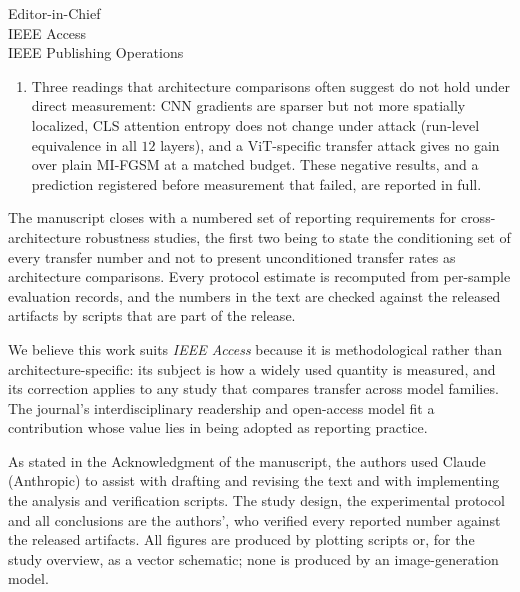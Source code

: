 \documentclass[11pt]{letter}
\begin{document}
\begin{letter}{
Editor-in-Chief\\
IEEE Access\\
IEEE Publishing Operations
}
\begin{enumerate}
    \item Three readings that architecture comparisons often suggest do not hold under direct measurement: CNN gradients are sparser but not more spatially localized, CLS attention entropy does not change under attack (run-level equivalence in all $12$ layers), and a ViT-specific transfer attack gives no gain over plain MI-FGSM at a matched budget. These negative results, and a prediction registered before measurement that failed, are reported in full.
\end{enumerate}

The manuscript closes with a numbered set of reporting requirements for cross-architecture robustness studies, the first two being to state the conditioning set of every transfer number and not to present unconditioned transfer rates as architecture comparisons. Every protocol estimate is recomputed from per-sample evaluation records, and the numbers in the text are checked against the released artifacts by scripts that are part of the release.

We believe this work suits \textit{IEEE Access} because it is methodological rather than architecture-specific: its subject is how a widely used quantity is measured, and its correction applies to any study that compares transfer across model families. The journal's interdisciplinary readership and open-access model fit a contribution whose value lies in being adopted as reporting practice.

As stated in the Acknowledgment of the manuscript, the authors used Claude (Anthropic) to assist with drafting and revising the text and with implementing the analysis and verification scripts. The study design, the experimental protocol and all conclusions are the authors', who verified every reported number against the released artifacts. All figures are produced by plotting scripts or, for the study overview, as a vector schematic; none is produced by an image-generation model.


\end{letter}
\end{document}
